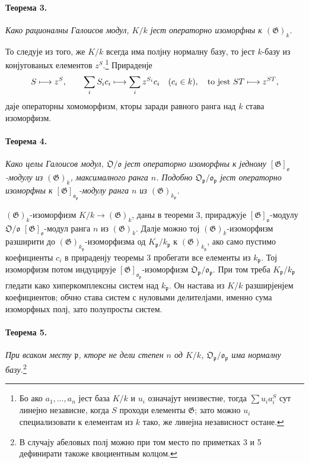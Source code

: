 \documentclass[11pt]{article}
\providecommand{\frakO}{\mathfrak{O}}
\providecommand{\frako}{\mathfrak{o}}
\providecommand{\frakp}{\mathfrak{p}}
\providecommand{\Gg}{\mathfrak{G}}
\begin{document}
\paragraph{Теорема 3.}
\emph{Како рационалны Галоисов модул, \(K/k\) јест операторно изоморфны к \((\Gg)_k\).}

То следује из того, же \(K/k\) всегда има полјну нормалну базу, то јест \(k\)-базу из конјугованых елементов \(z^S\).\footnote{Бо ако \(a_1,\ldots,a_n\) јест база \(K/k\) и \(u_i\) означајут неизвестне, тогда \(\sum u_i a_i^S\) сут линејно независне, когда \(S\) проходи елементы \(\Gg\); зато можно \(u_i\) специализовати к елементам из \(k\) тако, же линејна независност остане.} Прираденје
\[
        S\longmapsto z^S,
        \qquad
        \sum_i S_i c_i\longmapsto \sum_i z^{S_i}c_i
        \quad(c_i\in k),
        \quad\hbox{to jest } ST\longmapsto z^{ST},
\]
даје операторны хомоморфизм, кторы заради равного ранга над \(k\) става изоморфизм.

\paragraph{Теорема 4.}
\emph{Како целы Галоисов модул, \(\frakO/\frako\) јест операторно изоморфны к једному \([\Gg]_\frako\)-модулу из \((\Gg)_k\), максималного ранга \(n\). Подобно \(\frakO_\frakp/\frako_\frakp\) јест операторно изоморфны к \([\Gg]_{\frako_\frakp}\)-модулу ранга \(n\) из \((\Gg)_{k_\frakp}\).}

\((\Gg)_k\)-изоморфизм \(K/k\to(\Gg)_k\), даны в теореми 3, прираджује \([\Gg]_\frako\)-модулу \(\frakO/\frako\) \([\Gg]_\frako\)-модул ранга \(n\) из \((\Gg)_k\). Далје можно тој \((\Gg)_k\)-изоморфизм разширити до \((\Gg)_{k_\frakp}\)-изоморфизма од \(K_\frakp/k_\frakp\) к \((\Gg)_{k_\frakp}\), ако само пустимо коефициенты \(c_i\) в прираденју теоремы 3 пробегати все елементы из \(k_\frakp\). Тој изоморфизм потом индуцирује \([\Gg]_{\frako_\frakp}\)-изоморфизм \(\frakO_\frakp/\frako_\frakp\). При том треба \(K_\frakp/k_\frakp\) гледати како хиперкомплексны систем над \(k_\frakp\). Он настава из \(K/k\) разширјенјем коефициентов; обчно става систем с нуловыми делителјами, именно сума изоморфных полј, зато полупросты систем.

\paragraph{Теорема 5.}
\emph{При всаком месту \(\frakp\), кторе не дели степен \(n\) од \(K/k\), \(\frakO_\frakp/\frako_\frakp\) има нормалну базу.}\footnote{В случају абеловых полј можно при том место по приметках 3 и 5 дефинирати такоже квоциентным колцом.}
\end{document}
